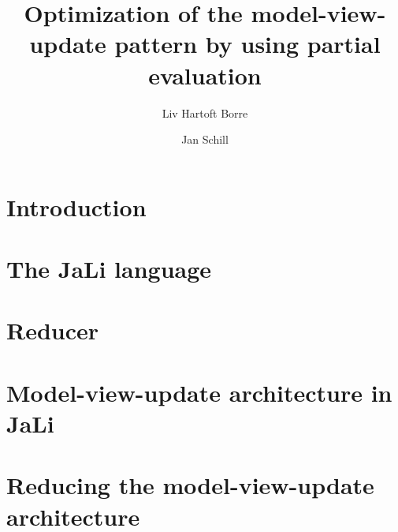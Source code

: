 \documentclass[runningheads]{llncs}
\begin{document}
\title{%
  Optimization of the model-view-update pattern
  by using partial evaluation\break%
}

\author{Liv Hartoft Borre 
\and Jan Schill
}



\maketitle

\begin{abstract}
    
\end{abstract}

\newcommand{\jan}[1]{\par\smallskip\noindent{\small\llap{\textbf{{jan:}~~}}{\textsf{#1}}}\par\smallskip}
\newcommand{\liv}[1]{\par\smallskip\noindent{\small\llap{\textsf{{liv:}~~}}{\textsl{#1}}}\par\smallskip}

\section{Introduction}

\newpage

\section{The JaLi language} \label{jali}

\newpage

\section{Reducer}

\newpage

\section{Model-view-update architecture in JaLi} \label{Model-view-update-architecture-in-JaLi}

\newpage

\section{Reducing the model-view-update architecture}

\newpage
\end{document}
